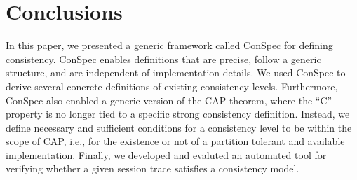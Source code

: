 \documentclass[journal,compsoc]{IEEEtran}
\newcommand\myeq{\stackrel{\mathclap{\normalfont\mbox{def}}}{=}}
\begin{document}

\section{Conclusions} \label{sec:conc}
In this paper, we presented a generic framework called ConSpec for defining consistency. ConSpec enables definitions that are precise, follow a generic structure, and are independent of implementation details. We used ConSpec to derive several concrete definitions of existing consistency levels. Furthermore, ConSpec also enabled a generic version of the CAP theorem, where the ``C'' property is no longer tied to a specific strong consistency definition. Instead, we define necessary and sufficient conditions for a consistency level to be within the scope of CAP, i.e., for the existence or not of a partition tolerant and available implementation.
Finally, we developed and evaluted an automated tool for verifying whether a given session trace satisfies a consistency model. 
\end{document}
